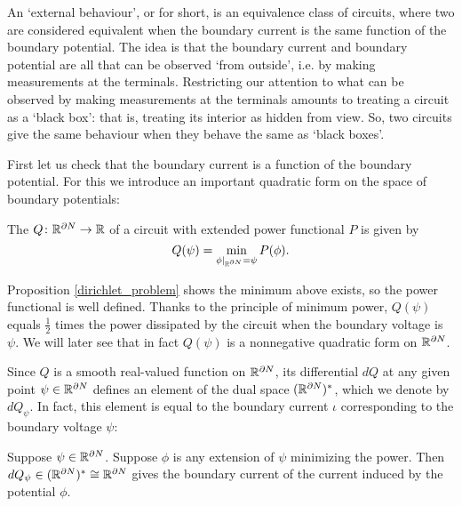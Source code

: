 An `external behaviour', or  for short, is an equivalence class of circuits, where two are considered equivalent when the boundary current is the same function of the boundary potential. The idea is that the boundary current and boundary potential are all that can be observed `from outside', i.e. by making measurements at the terminals.  Restricting our attention to what can be observed by making measurements at the terminals amounts to treating a circuit as a `black box': that is, treating its interior as hidden from view.  So, two circuits give the same behaviour when they behave the same as `black boxes'.

First let us check that the boundary current is a function of the boundary potential.  For this we introduce an important quadratic form on the space of boundary potentials:

\begin{definition}
The  $Q {\colon} {\mathbb{R}}^{\partial N} \to {\mathbb{R}}$ of a circuit with extended power functional $P$ is given by
\[
 Q(\psi) = \min_{\phi|_{{\mathbb{R}}^{\partial N}} = \psi } P(\phi).
\]
\end{definition}

Proposition \ref{dirichlet_problem} shows the minimum above exists, so the power functional is well defined.  Thanks to the principle of minimum power, $Q(\psi)$ equals $\frac{1}{2}$ times the power dissipated by the circuit when the boundary voltage is $\psi$.  We will later see that in fact $Q(\psi)$ is a nonnegative quadratic form on ${\mathbb{R}}^{\partial N}$. 

Since $Q$ is a smooth real-valued function on ${\mathbb{R}}^{\partial N}$, its differential $d Q$ at any given point $\psi \in {\mathbb{R}}^{\partial N}$ defines an element of the dual space $({\mathbb{R}}^{\partial N})^\ast$, which we denote by $d Q_\psi$.  In fact, this element is equal to the boundary current $\iota$ corresponding to the boundary voltage $\psi$:

\begin{proposition} \label{boundary_current_determines_boundary_voltage}
Suppose $\psi \in {\mathbb{R}}^{\partial N}$.  Suppose $\phi$ is any extension of $\psi$ minimizing the power. Then $dQ_\psi \in ({\mathbb{R}}^{\partial N})^\ast \cong {\mathbb{R}}^{\partial N}$ gives the boundary current of the current induced by the potential $\phi$.
\end{proposition}

